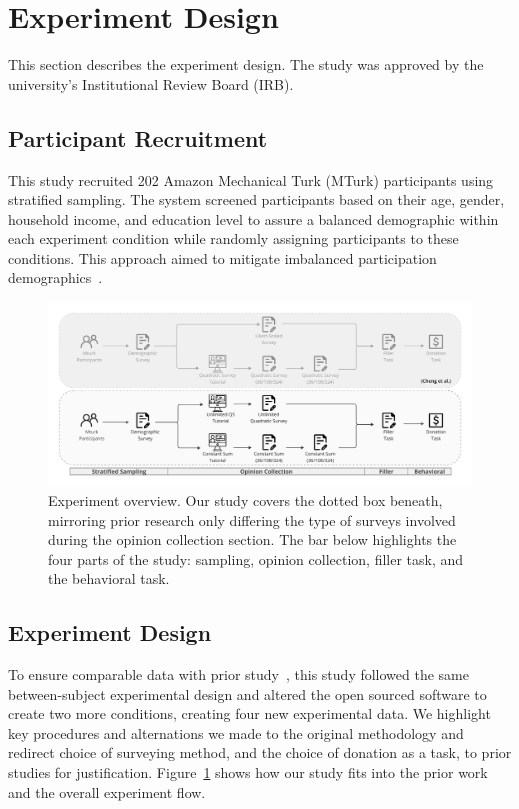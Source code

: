 \section{Experiment Design}
\label{sec:experiment}

This section describes the experiment design. The study was approved by the university's Institutional Review Board (IRB). 

\subsection{Participant Recruitment}
This study recruited 202 Amazon Mechanical Turk (MTurk) participants using stratified sampling. The system screened participants based on their age, gender, household income, and education level to assure a balanced demographic within each experiment condition while randomly assigning participants to these conditions. This approach aimed to mitigate imbalanced participation demographics~\cite{redmilesHowWellMy2019}.

\begin{figure}[t]
    \centering
    \includegraphics[width=\textwidth]{content/image/whyqs_exp_flow.pdf}
    \caption{Experiment overview. Our study covers the dotted box beneath, mirroring prior research only differing the type of surveys involved during the opinion collection section. The bar below highlights the four parts of the study: sampling, opinion collection, filler task, and the behavioral task.}
    \label{fig:experiment}
\end{figure}

\subsection{Experiment Design}
To ensure comparable data with prior study~\cite{chengCanShowWhat2021}, this study followed the same between-subject experimental design and altered the open sourced software to create two more conditions, creating four new experimental data. We highlight key procedures and alternations we made to the original methodology and redirect choice of surveying method, and the choice of donation as a task, to prior studies for justification. Figure~\ref{fig:experiment} shows how our study fits into the prior work and the overall experiment flow.

